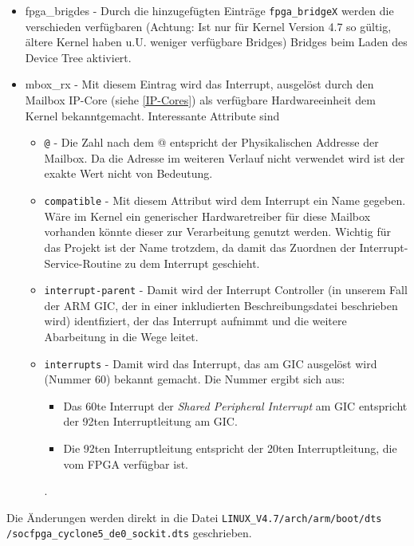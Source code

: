 \begin{itemize}
	\item fpga\_brigdes - Durch die hinzugefügten Einträge \texttt{fpga\_bridgeX} werden die verschieden verfügbaren (Achtung: Ist nur für Kernel Version 4.7 so gültig, ältere Kernel haben u.U. weniger verfügbare Bridges) Bridges beim Laden des Device Tree aktiviert.
	\item mbox\_rx - Mit diesem Eintrag wird das Interrupt, ausgelöst durch den Mailbox \ac{IP}-Core (siehe \ref{IP-Cores}) als verfügbare Hardwareeinheit dem Kernel bekanntgemacht. Interessante Attribute sind
	\begin{itemize}
		\item \texttt{@} - Die Zahl nach dem @ entspricht der Physikalischen Addresse der Mailbox. Da die Adresse im weiteren Verlauf nicht verwendet wird ist der exakte Wert nicht von Bedeutung.
		\item \texttt{compatible} - Mit diesem Attribut wird dem Interrupt ein Name gegeben. Wäre im Kernel ein generischer Hardwaretreiber für diese Mailbox vorhanden könnte dieser zur Verarbeitung genutzt werden. Wichtig für das Projekt ist der Name trotzdem, da damit das Zuordnen der Interrupt-Service-Routine zu dem Interrupt geschieht.
		\item \texttt{interrupt-parent} - Damit wird der Interrupt Controller (in unserem Fall der ARM GIC, der in einer inkludierten Beschreibungsdatei beschrieben wird) identfiziert, der das Interrupt aufnimmt und die weitere Abarbeitung in die Wege leitet.
		\item \texttt{interrupts} - Damit wird das Interrupt, das am GIC ausgelöst wird (Nummer 60) bekannt gemacht. Die Nummer ergibt sich aus:
		\begin{itemize}
			\item Das 60te Interrupt der \textit{Shared Peripheral Interrupt} am GIC entspricht der 92ten Interruptleitung am GIC.
			\item Die 92ten Interruptleitung entspricht der 20ten Interruptleitung, die vom \ac{FPGA} verfügbar ist.
		\end{itemize}
		\cite{interrupts_linux}.
	\end{itemize}
\end{itemize}
Die Änderungen werden direkt in die Datei \texttt{LINUX\_V4.7/arch/arm/boot/dts\\/socfpga\_cyclone5\_de0\_sockit.dts} geschrieben.

